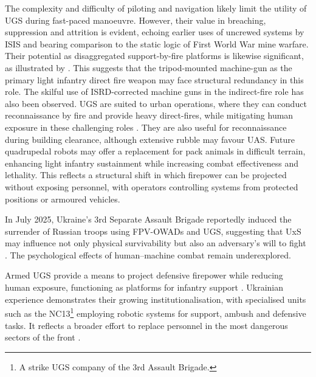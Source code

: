 {The complexity and difficulty of piloting and navigation likely limit the utility of UGS during fast-paced manoeuvre. However, their value in breaching, suppression and attrition is evident, echoing earlier uses of uncrewed systems by ISIS \parencite{tveteras_2022_islamic_state_vehicle_industry} and bearing comparison to the static logic of First World War mine warfare. Their potential as disaggregated support-by-fire platforms is likewise significant, as illustrated by \textcite[fig.~4]{watling_2025_10}. This suggests that the tripod-mounted machine-gun as the primary light infantry direct fire weapon may face structural redundancy in this role. The skilful use of ISRD-corrected machine guns in the indirect-fire role has also been observed. UGS are suited to urban operations, where they can conduct reconnaissance by fire and provide heavy direct-fires, while mitigating human exposure in these challenging roles \parencite[151]{stu_lyle_participant_11,Watling_book}. They are also useful for reconnaissance during building clearance, although extensive rubble may favour UAS. Future quadrupedal robots may offer a replacement for pack animals in difficult terrain, enhancing light infantry sustainment while increasing combat effectiveness and lethality. This reflects a structural shift in which firepower can be projected without exposing personnel, with operators controlling systems from protected positions or armoured vehicles.

In July 2025, Ukraine’s 3rd Separate Assault Brigade reportedly induced the surrender of Russian troops using FPV-OWADs and UGS, suggesting that UxS may influence not only physical survivability but also an adversary’s will to fight \parencite{drone_surrender_1,drone_surrender_2,drone_surrender}. The psychological effects of human--machine combat remain underexplored.


Armed UGS provide a means to project defensive firepower while reducing human exposure, functioning as  platforms for infantry support \parencite{david_participant_2}. Ukrainian experience demonstrates their growing institutionalisation, with specialised units such as the NC13\footnote{A strike UGS company of the 3rd Assault Brigade.} employing robotic systems for support, ambush and defensive tasks. It reflects a broader effort to replace personnel in the most dangerous sectors of the front \parencite{devdroid_2026_drones_change_warfare_interview,suprun_2025_09_05_nc13_nrk_interview}. 

}

